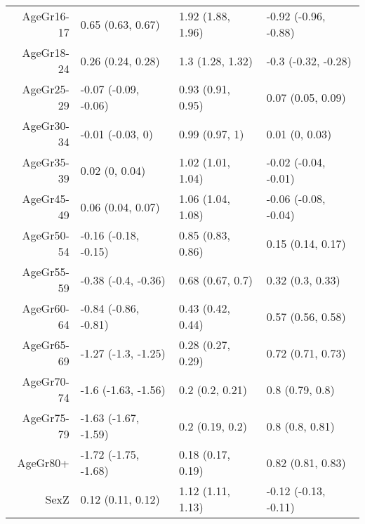\begin{table}[ht]
\begin{tabular}{rlll}
  AgeGr16-17 & 0.65 (0.63, 0.67) & 1.92 (1.88, 1.96) & -0.92 (-0.96, -0.88) \\ 
  AgeGr18-24 & 0.26 (0.24, 0.28) & 1.3 (1.28, 1.32) & -0.3 (-0.32, -0.28) \\ 
  AgeGr25-29 & -0.07 (-0.09, -0.06) & 0.93 (0.91, 0.95) & 0.07 (0.05, 0.09) \\ 
  AgeGr30-34 & -0.01 (-0.03, 0) & 0.99 (0.97, 1) & 0.01 (0, 0.03) \\ 
  AgeGr35-39 & 0.02 (0, 0.04) & 1.02 (1.01, 1.04) & -0.02 (-0.04, -0.01) \\ 
  AgeGr45-49 & 0.06 (0.04, 0.07) & 1.06 (1.04, 1.08) & -0.06 (-0.08, -0.04) \\ 
  AgeGr50-54 & -0.16 (-0.18, -0.15) & 0.85 (0.83, 0.86) & 0.15 (0.14, 0.17) \\ 
  AgeGr55-59 & -0.38 (-0.4, -0.36) & 0.68 (0.67, 0.7) & 0.32 (0.3, 0.33) \\ 
  AgeGr60-64 & -0.84 (-0.86, -0.81) & 0.43 (0.42, 0.44) & 0.57 (0.56, 0.58) \\ 
  AgeGr65-69 & -1.27 (-1.3, -1.25) & 0.28 (0.27, 0.29) & 0.72 (0.71, 0.73) \\ 
  AgeGr70-74 & -1.6 (-1.63, -1.56) & 0.2 (0.2, 0.21) & 0.8 (0.79, 0.8) \\ 
  AgeGr75-79 & -1.63 (-1.67, -1.59) & 0.2 (0.19, 0.2) & 0.8 (0.8, 0.81) \\ 
  AgeGr80+ & -1.72 (-1.75, -1.68) & 0.18 (0.17, 0.19) & 0.82 (0.81, 0.83) \\ 
  SexZ & 0.12 (0.11, 0.12) & 1.12 (1.11, 1.13) & -0.12 (-0.13, -0.11) \\ 
   \hline
\end{tabular}
\end{table}

